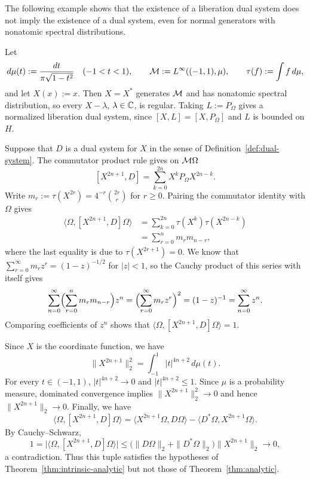 The following example shows that the existence of a liberation dual system does not imply the existence of a dual system, even for normal generators with nonatomic spectral distributions.

\begin{example}\label{ex:liberation-without-duals}
Let
\[
 d\mu(t):=\frac{dt}{\pi\sqrt{1-t^2}}\quad(-1<t<1),\qquad
 \mathcal M:=L^\infty((-1,1),\mu),\qquad \tau(f):=\int f\,d\mu,
\]
and let $X(x):=x$.
Then $X=X^*$ generates $\mathcal M$ and has nonatomic spectral distribution, so every $X-\lambda$, $\lambda\in\mathbb C$, is regular.
Taking $L:=P_\Omega$ gives a normalized liberation dual system, since $[X,L]=[X,P_\Omega]$ and $L$ is bounded on $H$.

Suppose that $D$ is a dual system for $X$ in the sense of Definition~\ref{def:dual-system}.
The commutator product rule gives on $\mathcal M\Omega$
\[
 [X^{2n+1},D]=\sum_{k=0}^{2n}X^kP_\Omega X^{2n-k}.
\]
Write $m_r:=\tau(X^{2r})=4^{-r}\binom{2r}{r}$ for $r\geq0$.
Pairing the commutator identity with $\Omega$ gives
\[
 \begin{aligned}
 \langle\Omega,[X^{2n+1},D]\Omega\rangle
 &=\sum_{k=0}^{2n}\tau(X^k)\tau(X^{2n-k})\\
 &=\sum_{r=0}^{n}m_r m_{n-r},
 \end{aligned}
\]
where the last equality is due to $\tau(X^{2r+1})=0$.
We know that $\sum_{r=0}^\infty m_r z^r=(1-z)^{-1/2}$ for $|z|<1$, so the Cauchy product of this series with itself gives
\[
 \sum_{n=0}^\infty\Bigl(\sum_{r=0}^n m_r m_{n-r}\Bigr)z^n
 =\Bigl(\sum_{r=0}^\infty m_r z^r\Bigr)^2
 =(1-z)^{-1}
 =\sum_{n=0}^\infty z^n.
\]
Comparing coefficients of $z^n$ shows that $\langle\Omega,[X^{2n+1},D]\Omega\rangle=1$.

Since $X$ is the coordinate function, we have
\[
 \|X^{2n+1}\|_2^2=\int_{-1}^1 |t|^{4n+2}\,d\mu(t).
\]
For every $t\in(-1,1)$, $|t|^{4n+2}\to0$ and $|t|^{4n+2}\leq1$.
Since $\mu$ is a probability measure, dominated convergence implies $\|X^{2n+1}\|_2^2\to0$ and hence $\|X^{2n+1}\|_2\to0$.
Finally, we have
\[
 \langle\Omega,[X^{2n+1},D]\Omega\rangle
 =\langle X^{2n+1}\Omega,D\Omega\rangle
  -\langle D^*\Omega,X^{2n+1}\Omega\rangle.
\]
By Cauchy--Schwarz,
\[
 1=\bigl|\langle\Omega,[X^{2n+1},D]\Omega\rangle\bigr|
 \leq\bigl(\|D\Omega\|_2+\|D^*\Omega\|_2\bigr)\|X^{2n+1}\|_2
 \longrightarrow0,
\]
a contradiction.
Thus this tuple satisfies the hypotheses of Theorem~\ref{thm:intrinsic-analytic} but not those of Theorem~\ref{thm:analytic}.
\end{example}

